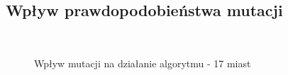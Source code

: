 \documentclass[12pt, a4paper]{article}
\begin{document}
\subsection{Wpływ prawdopodobieństwa mutacji}
\begin{figure}[H]
\centering
\mbox{\quad
{} 
}
\caption{Wpływ mutacji na działanie algorytmu - 17 miast}
\end{figure}
\end{document}
